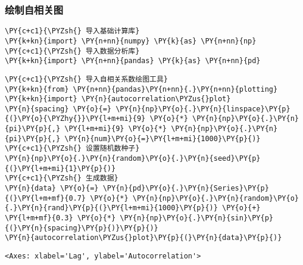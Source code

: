     \hypertarget{ux7ed8ux5236ux81eaux76f8ux5173ux56fe}{%
\subsubsection{绘制自相关图}\label{ux7ed8ux5236ux81eaux76f8ux5173ux56fe}}

    \begin{tcolorbox}[breakable, size=fbox, boxrule=1pt, pad at break*=1mm,colback=cellbackground, colframe=cellborder]
\begin{Verbatim}[commandchars=\\\{\}]
\PY{c+c1}{\PYZsh{} 导入基础计算库}
\PY{k+kn}{import} \PY{n+nn}{numpy} \PY{k}{as} \PY{n+nn}{np}
\PY{c+c1}{\PYZsh{} 导入数据分析库}
\PY{k+kn}{import} \PY{n+nn}{pandas} \PY{k}{as} \PY{n+nn}{pd}
\end{Verbatim}
\end{tcolorbox}

    \begin{tcolorbox}[breakable, size=fbox, boxrule=1pt, pad at break*=1mm,colback=cellbackground, colframe=cellborder]
\begin{Verbatim}[commandchars=\\\{\}]
\PY{c+c1}{\PYZsh{} 导入自相关系数绘图工具}
\PY{k+kn}{from} \PY{n+nn}{pandas}\PY{n+nn}{.}\PY{n+nn}{plotting} \PY{k+kn}{import} \PY{n}{autocorrelation\PYZus{}plot}
\PY{n}{spacing} \PY{o}{=} \PY{n}{np}\PY{o}{.}\PY{n}{linspace}\PY{p}{(}\PY{o}{\PYZhy{}}\PY{l+m+mi}{9} \PY{o}{*} \PY{n}{np}\PY{o}{.}\PY{n}{pi}\PY{p}{,} \PY{l+m+mi}{9} \PY{o}{*} \PY{n}{np}\PY{o}{.}\PY{n}{pi}\PY{p}{,} \PY{n}{num}\PY{o}{=}\PY{l+m+mi}{1000}\PY{p}{)}
\PY{c+c1}{\PYZsh{} 设置随机数种子}
\PY{n}{np}\PY{o}{.}\PY{n}{random}\PY{o}{.}\PY{n}{seed}\PY{p}{(}\PY{l+m+mi}{1}\PY{p}{)}
\PY{c+c1}{\PYZsh{} 生成数据}
\PY{n}{data} \PY{o}{=} \PY{n}{pd}\PY{o}{.}\PY{n}{Series}\PY{p}{(}\PY{l+m+mf}{0.7} \PY{o}{*} \PY{n}{np}\PY{o}{.}\PY{n}{random}\PY{o}{.}\PY{n}{rand}\PY{p}{(}\PY{l+m+mi}{1000}\PY{p}{)} \PY{o}{+} \PY{l+m+mf}{0.3} \PY{o}{*} \PY{n}{np}\PY{o}{.}\PY{n}{sin}\PY{p}{(}\PY{n}{spacing}\PY{p}{)}\PY{p}{)}
\PY{n}{autocorrelation\PYZus{}plot}\PY{p}{(}\PY{n}{data}\PY{p}{)}
\end{Verbatim}
\end{tcolorbox}

            \begin{tcolorbox}[breakable, size=fbox, boxrule=.5pt, pad at break*=1mm, opacityfill=0]
\begin{Verbatim}[commandchars=\\\{\}]
<Axes: xlabel='Lag', ylabel='Autocorrelation'>
\end{Verbatim}
\end{tcolorbox}
        
    \begin{center}
    \end{center}
    { \hspace*{\fill} \\}
